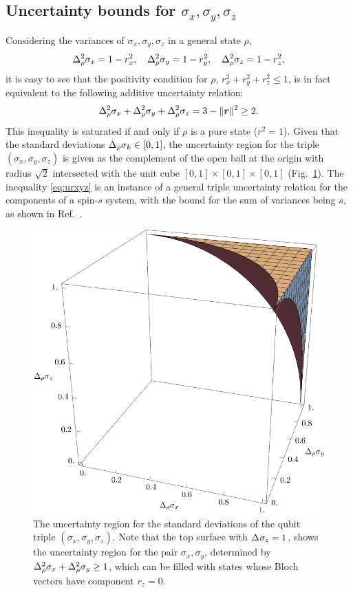 \subsection{Uncertainty bounds for $\sigma_x,\sigma_y,\sigma_z$}\label{sec:xyz}
Considering the variances of $\sigma_x,\sigma_y,\sigma_z$ in a general state $\rho$,
\begin{equation}
  \varr{\sigma_x}=1-r_x^2,\quad \varr{\sigma_y}=1-r_y^2,  \quad \varr{\sigma_z}=1-r_z^2,
\end{equation}
it is easy to see that the positivity condition for $\rho$, $r_x^2+r_y^2+r_z^2\le 1$, is in fact equivalent to the following additive uncertainty relation:
\begin{align}\label{eq:urxyz}
  \varr{\sigma_x}+\varr{\sigma_y}+\varr{\sigma_z}=3-\|\bor\|^2\ge 2.
\end{align}
This inequality is saturated if and only if $\rho$ is a pure state ($r^2=1$).
Given that the standard deviations $\sdevr{\sigma_k}\in[0,1]$, the uncertainty region for the triple $(\sigma_x,\sigma_y,\sigma_z)$ is given as the complement of the open ball at the origin with radius $\sqrt{2}$ intersected with the unit cube $[0,1]\times[0,1]\times[0,1]$ (Fig.~\ref{fig:orth-triple}). The inequality \eqref{eq:urxyz} is an instance of a general triple uncertainty relation for the components of a spin-$s$ system, with the bound for the sum of variances being $s$, as shown in Ref.~\cite{Hofmann03}.

\begin{center}
  \begin{figure}[ht]
    \includegraphics[width=.5\textwidth]{figs/qubit-triple}
    \caption[The uncertainty region for the standard deviations of the qubit triple $(\sigma_x,\sigma_y,\sigma_z)$]{The uncertainty region for the standard deviations of the qubit triple $(\sigma_x,\sigma_y,\sigma_z)$. Note that the top surface with $\sdev{\sigma_z}=1$, shows the uncertainty region for the pair $\sigma_x,\sigma_y$, determined by
    $\varr{\sigma_x}+\varr{\sigma_y}\ge 1$, which can be filled with states whose Bloch vectors have component $r_z=0$.}
    \label{fig:orth-triple}
  \end{figure}
\end{center}

